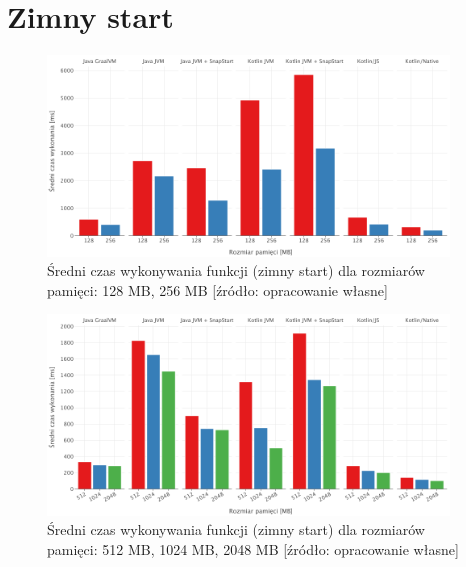 \section{Zimny start}\label{chapter:results_cold_start}

\begin{figure}[h]
    \centering
    \includegraphics[width=0.95\textwidth]{charts/results/avg-cold-start-128-256.png}
    \caption{Średni czas wykonywania funkcji (zimny start) dla rozmiarów pamięci: 128 MB, 256 MB  [źródło: opracowanie własne]}
    \label{fig:avg_cold_start_128_256}
\end{figure}

\begin{figure}[h]
    \centering
    \includegraphics[width=0.95\textwidth]{charts/results/avg-cold-start-512-2048.png}
    \caption{Średni czas wykonywania funkcji (zimny start) dla rozmiarów pamięci: 512 MB, 1024 MB, 2048 MB  [źródło: opracowanie własne]}
    \label{fig:avg_cold_start_512_2045}
\end{figure}

